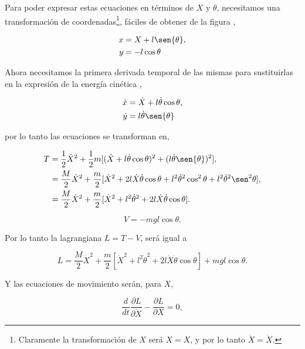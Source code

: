 \documentclass[a4paper,10pt]{article}
\numberwithin{equation}{section}
\begin{document}
Para poder expresar estas ecuaciones en términos de $X$ y $\theta$, necesitamos una 
transformación de coordenadas\footnote{Claramente la transformación de $X$ será $X = X$, 
y por lo tanto $\dot{X} = \dot{X}$.}, fáciles de obtener de la figura 
,

\begin{align}
 x &= X + l \sen{\theta}, \\
 y &= -l \cos{\theta}
\end{align}

Ahora necesitamos la primera derivada temporal de las mismas para sustituirlas en 
la expresión de la energía cinética ,

\begin{align}
 \dot{x} &= \dot{X} + l \dot{\theta} \cos{\theta}, \\
 \dot{y} &= l \dot{\theta} \sen{\theta}
\end{align}

por lo tanto las ecuaciones  se transforman en,

\begin{align}
 \begin{split}
  T &= \frac{1}{2} \dot{X}^2 + \frac{1}{2}m[(\dot{X}+ l \dot{\theta} \cos{\theta})^2 +
    (l \dot{\theta} \sen{\theta})^2], \\
    &= \frac{M}{2}\dot{X}^2 + \frac{m}{2}[\dot{X}^2 + 2l\dot{X}\dot{\theta}\cos{\theta} + 
    l^2 \dot{\theta}^2 \cos^2{\theta} + l^2 \dot{\theta}^2 \sen^2{\theta}], \\
    &= \frac{M}{2}\dot{X}^2 + \frac{m}{2}[\dot{X}^2 + l^2 \dot{\theta}^2 + 
    2l\dot{X}\dot{\theta}\cos{\theta}].
 \end{split}
\end{align}

\begin{equation}
 V = -mgl \cos{\theta}.
\end{equation}

Por lo tanto la lagrangiana $L = T - V$, será igual a 

\begin{equation}
 L = \frac{M}{2}\dot{X}^2 + \frac{m}{2}[\dot{X}^2 + l^2 \dot{\theta}^2 + 
    2l\dot{X}\dot{\theta}\cos{\theta}] + mgl \cos{\theta}.
\end{equation}

Y las ecuaciones de movimiento serán, para $X$,

\begin{equation}
 \frac{d}{dt}\frac{\partial L}{\partial \dot{X}} - \frac{\partial L}{\partial X} = 0,
\end{equation}
\end{document}
